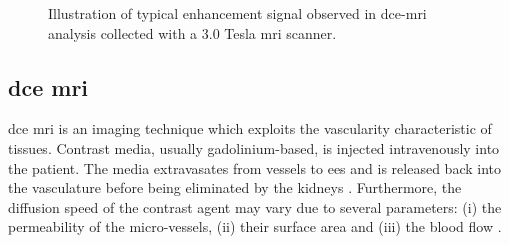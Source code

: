 \begin{figure}
\centering
	\hspace*{\fill}
	 \hfill
	\hspace*{\fill}
	\caption[Enhancement of \ac{dce}-\ac{mri} signal.]{Illustration of typical enhancement signal observed in \ac{dce}-\ac{mri} analysis collected with a 3.0 Tesla \ac{mri} scanner.}
	\label{fig:dceana}
\end{figure}

\subsection{\acs*{dce} \ac{mri}}\label{subsec:chp2:imaging:dce}
\ac{dce} \ac{mri} is an imaging technique which exploits the vascularity characteristic of tissues.
Contrast media, usually gadolinium-based, is injected intravenously into the patient.
The media extravasates from vessels to \ac{ees} and is released back into the vasculature before being eliminated by the kidneys \cite{Gribbestad2005}.
Furthermore, the diffusion speed of the contrast agent may vary due to several parameters: (i) the permeability of the micro-vessels, (ii) their surface area and (iii) the blood flow \cite{Padhani2002}.


